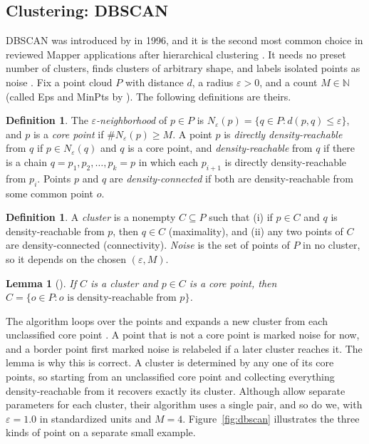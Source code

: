 \documentclass{article}
\newcommand{\N}{\mathbb{N}}
\newtheorem{lemma}[theorem]{Lemma}
\theoremstyle{definition}
\newtheorem{definition}[theorem]{Definition}
\theoremstyle{remark}
\begin{document}
\subsection{Clustering: DBSCAN}\label{sec:dbscan}
DBSCAN was introduced by \textcite{ester1996dbscan} in 1996, and it is the second most common choice in reviewed Mapper applications after hierarchical clustering \parencite{madukpe2026review}.
It needs no preset number of clusters, finds clusters of arbitrary shape, and labels isolated points as noise \parencite{ester1996dbscan}.
Fix a point cloud $P$ with distance $d$, a radius $\varepsilon > 0$, and a count $M \in \N$ (called Eps and MinPts by \textcite{ester1996dbscan}). The following definitions are theirs.

\begin{definition}
The \emph{$\varepsilon$-neighborhood} of $p \in P$ is $N_\varepsilon(p) = \{ q \in P : d(p,q) \le \varepsilon \}$, and $p$ is a \emph{core point} if $\# N_\varepsilon(p) \ge M$.
A point $p$ is \emph{directly density-reachable} from $q$ if $p \in N_\varepsilon(q)$ and $q$ is a core point, and \emph{density-reachable} from $q$ if there is a chain $q = p_1, p_2, \dots, p_k = p$ in which each $p_{i+1}$ is directly density-reachable from $p_i$.
Points $p$ and $q$ are \emph{density-connected} if both are density-reachable from some common point $o$.
\end{definition}
\begin{definition}
A \emph{cluster} is a nonempty $C \subseteq P$ such that (i) if $p \in C$ and $q$ is density-reachable from $p$, then $q \in C$ (maximality), and (ii) any two points of $C$ are density-connected (connectivity).
\emph{Noise} is the set of points of $P$ in no cluster, so it depends on the chosen $(\varepsilon, M)$.
\end{definition}
\begin{lemma}[{\textcite{ester1996dbscan}}]
If $C$ is a cluster and $p \in C$ is a core point, then $C = \{ o \in P : o \text{ is density-reachable from } p \}$.
\end{lemma}
The algorithm loops over the points and expands a new cluster from each unclassified core point \parencite[p.~229]{ester1996dbscan}. A point that is not a core point is marked noise for now, and a border point first marked noise is relabeled if a later cluster reaches it.
The lemma is why this is correct. A cluster is determined by any one of its core points, so starting from an unclassified core point and collecting everything density-reachable from it recovers exactly its cluster.
Although \textcite{ester1996dbscan} allow separate parameters for each cluster, their algorithm uses a single pair, and so do we, with $\varepsilon = 1.0$ in standardized units and $M = 4$.
Figure~\ref{fig:dbscan} illustrates the three kinds of point on a separate small example.
\end{document}
